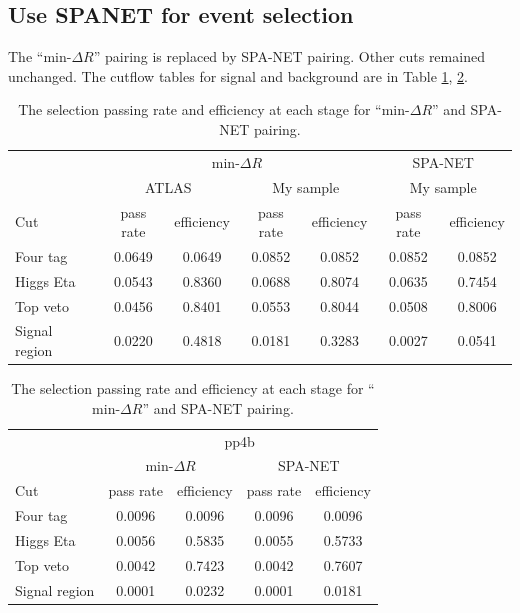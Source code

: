 \documentclass[12pt]{article}
\begin{document}
	\subsection{Use SPANET for event selection}%
	\label{sub:use_spanet_for_event_selection}
		The ``$ \text{min-}\Delta R$'' pairing is replaced by SPA-NET pairing. Other cuts remained unchanged. The cutflow tables for signal and background are in Table \ref{tab:signal_selection_efficiency_SPANet}, \ref{tab:signal_selection_efficiency_background_SPANet}.
		\begin{table}[htpb]
			\centering
			\caption{The selection passing rate and efficiency at each stage for ``$\text{min-}\Delta R$'' and SPA-NET pairing.}
			\label{tab:signal_selection_efficiency_SPANet}
			\begin{tabular}{l|cc|cc|cc}
					& \multicolumn{4}{c|}{$\text{min-}\Delta R$}                               & \multicolumn{2}{c}{SPA-NET}   \\
							  & \multicolumn{2}{c|}{ATLAS} & \multicolumn{2}{c|}{My sample}             & \multicolumn{2}{c}{My sample} \\
				Cut           & pass rate   & efficiency  & pass rate & \multicolumn{1}{c|}{efficiency} & pass rate     & efficiency    \\ \hline
				Four tag      & 0.0649 & 0.0649 & 0.0852 & 0.0852 & 0.0852 & 0.0852\\
				Higgs Eta     & 0.0543 & 0.8360 & 0.0688 & 0.8074 & 0.0635 & 0.7454\\
				Top veto      & 0.0456 & 0.8401 & 0.0553 & 0.8044 & 0.0508 & 0.8006\\
				Signal region & 0.0220 & 0.4818 & 0.0181 & 0.3283 & 0.0027 & 0.0541\\
			\end{tabular}
		\end{table}
		\begin{table}[htpb]
			\centering
			\caption{The selection passing rate and efficiency at each stage for ``$\text{min-}\Delta R$'' and SPA-NET pairing. }
			\label{tab:signal_selection_efficiency_background_SPANet}
			\begin{tabular}{l|cc|cc}
							  & \multicolumn{4}{c}{pp4b}                                                         \\
							  & \multicolumn{2}{c|}{$\text{min-}\Delta R$}& \multicolumn{2}{c}{SPA-NET} \\
				Cut           & pass rate               & efficiency                & pass rate    & efficiency   \\ \hline
				Four tag      & 0.0096                  & 0.0096                    & 0.0096       & 0.0096       \\
				Higgs Eta     & 0.0056                  & 0.5835                    & 0.0055       & 0.5733       \\
				Top veto      & 0.0042                  & 0.7423                    & 0.0042       & 0.7607      \\
				Signal region & 0.0001                  & 0.0232                    & 0.0001       & 0.0181       \\
			\end{tabular}
		\end{table}
\end{document}

